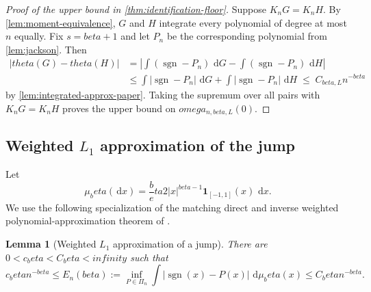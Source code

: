 \documentclass[11pt]{article}
\def\beta{beta}%
\def\theta{theta}%
\def\omega{omega}%
\def\infty{infinity}%
\newtheorem{lemma}[theorem]{Lemma}
\newcommand{\one}{\mathbf 1}
\newcommand{\sgn}{\operatorname{sgn}}
\newcommand{\dd}{\,\mathrm d}
\newcommand\eed[1]{{\color{green!45!black} #1}}
\begin{document}
\begin{proof}[Proof of the upper bound in \cref{thm:identification-floor}]
\eed{Suppose $K_nG=K_nH$.  By \cref{lem:moment-equivalence}, $G$ and $H$ integrate every polynomial of degree at most $n$ equally.  Fix $s=\beta+1$ and let $P_n$ be the corresponding polynomial from \cref{lem:jackson}.  Then
\begin{align*}
|\theta(G)-\theta(H)|
&=
\left|
\int(\sgn-P_n)\,\dd G
-
\int(\sgn-P_n)\,\dd H
\right|\\
&\le
\int|\sgn-P_n|\,\dd G
+
\int|\sgn-P_n|\,\dd H \;\le\;
C_{\beta,L}n^{-\beta}
\end{align*}
by \cref{lem:integrated-approx-paper}.  Taking the supremum over all pairs with $K_nG=K_nH$ proves the upper bound on $\omega_{n,\beta,L}(0)$.}
\end{proof}

\subsection{Weighted \texorpdfstring{$L_1$}{L1} approximation of the jump}

Let
\[
\mu_\beta(\dd x)
=
\frac\beta2|x|^{\beta-1}\one_{[-1,1]}(x)\,\dd x.
\]
We use the following specialization of the matching direct and inverse weighted polynomial-approximation theorem of \citet{Kopotun}.

\begin{lemma}[Weighted $L_1$ approximation of a jump]
\label{lem:weighted-sign-paper}
There are $0<c_\beta<C_\beta<\infty$ such that
\begin{equation}
\label{eq:weighted-sign-rate-paper}
c_\beta n^{-\beta}
\le
E_n(\beta)
:=
\inf_{P\in\Pi_n}
\int|\sgn(x)-P(x)|\,\dd\mu_\beta(x)
\le
C_\beta n^{-\beta}.
\end{equation}
\end{lemma}
\end{document}
